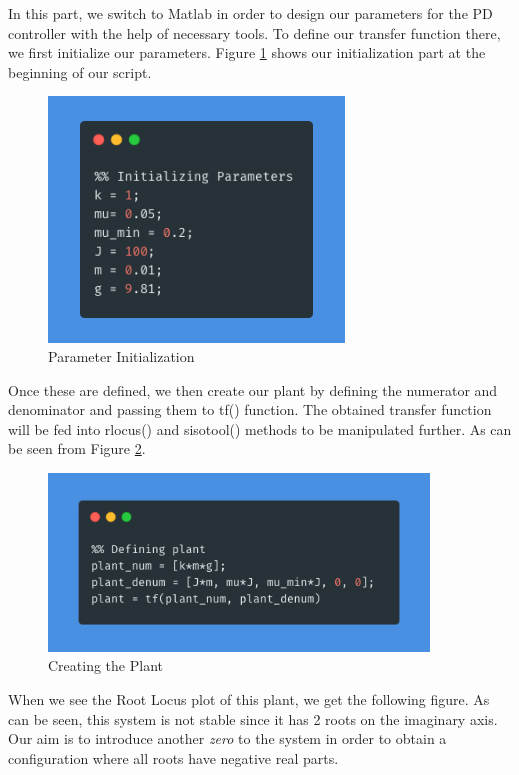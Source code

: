 In this part, we switch to Matlab in order to design our parameters for the PD controller with the help of necessary tools. To define our transfer function there, we first initialize our parameters. Figure \ref{fig:init} shows our initialization part at the beginning of our script.

\begin{figure}[H]
    \centering
    \includegraphics[width=0.7\textwidth]{images/initalization.png}
    \caption{Parameter Initialization}
    \label{fig:init}
\end{figure}

Once these are defined, we then create our plant by defining the numerator and denominator and passing them to tf() function. The obtained transfer function will be fed into rlocus() and sisotool() methods to be manipulated further. As can be seen from Figure \ref{fig:plant_ss}.

\begin{figure}[H]
    \centering
    \includegraphics[width=0.9\textwidth]{images/plant_def.png}
    \caption{Creating the Plant}
    \label{fig:plant_ss}
\end{figure}
\newpage
When we see the \textit{}{Root Locus plot} of this plant, we get the following figure. As can be seen, this system is not stable since it has 2 roots on the imaginary axis. Our aim is to introduce another \textit{zero} to the system in order to obtain a configuration where all roots have negative real parts.


